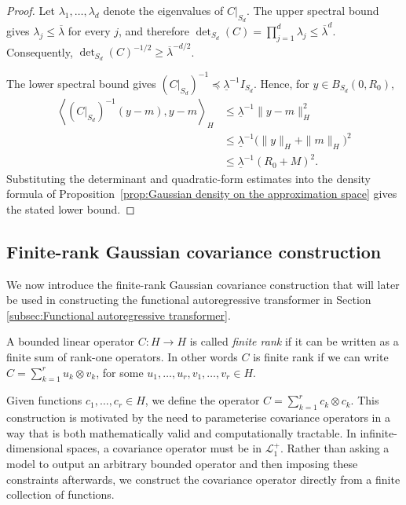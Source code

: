 \begin{proof}
Let \(\lambda_1,\ldots,\lambda_d\) denote the eigenvalues of \(C|_{S_d}\). The upper spectral bound gives \(\lambda_j\leqslant\overline\lambda\) for every \(j\), and therefore
\(
\det_{S_d}(C)
=
\prod_{j=1}^d\lambda_j
\leqslant
\overline\lambda^d.
\)
Consequently, \(\det_{S_d}(C)^{-1/2}\geqslant\overline\lambda^{-d/2}\).

The lower spectral bound gives
\(
(C|_{S_d})^{-1}
\preceq
\underline\lambda^{-1}I_{S_d}.
\)
Hence, for \(y\in B_{S_d}(0,R_0)\),
\[
\begin{aligned}
\left\langle
(C|_{S_d})^{-1}(y-m),y-m
\right\rangle_H
&\leqslant
\underline\lambda^{-1}\|y-m\|_H^2\\
&\leqslant
\underline\lambda^{-1}
\bigl(\|y\|_H+\|m\|_H\bigr)^2\\
&\leqslant
\underline\lambda^{-1}(R_0+M)^2.
\end{aligned}
\]
Substituting the determinant and quadratic-form estimates into the density formula of Proposition~\ref{prop:Gaussian density on the approximation space} gives the stated lower bound.
\end{proof}


\subsection{Finite-rank Gaussian covariance construction}\label{subsec:Finite-rank Gaussian covariance construction}

We now introduce the finite-rank Gaussian covariance construction that will later be used in constructing the functional autoregressive transformer in Section \ref{subsec:Functional autoregressive transformer}.

\begin{definition}
A bounded linear operator \(C:H\to H\) is called \emph{finite rank} if it can be written as a finite sum of rank-one operators. In other words \(C\) is finite rank if we can write \(C=\sum_{k=1}^r u_k\otimes v_k\), for some \(u_1,\ldots,u_r,v_1,\ldots,v_r\in H\).
\end{definition}

Given functions \(c_1,\ldots,c_r\in H\), we define the operator \(C=\sum_{k=1}^r c_k\otimes c_k\). This construction is motivated by the need to parameterise covariance operators in a way that is both mathematically valid and computationally tractable. In infinite-dimensional spaces, a covariance operator must be in \(\mathcal L_1^+\). Rather than asking a model to output an arbitrary bounded operator and then imposing these constraints afterwards, we construct the covariance operator directly from a finite collection of functions.

